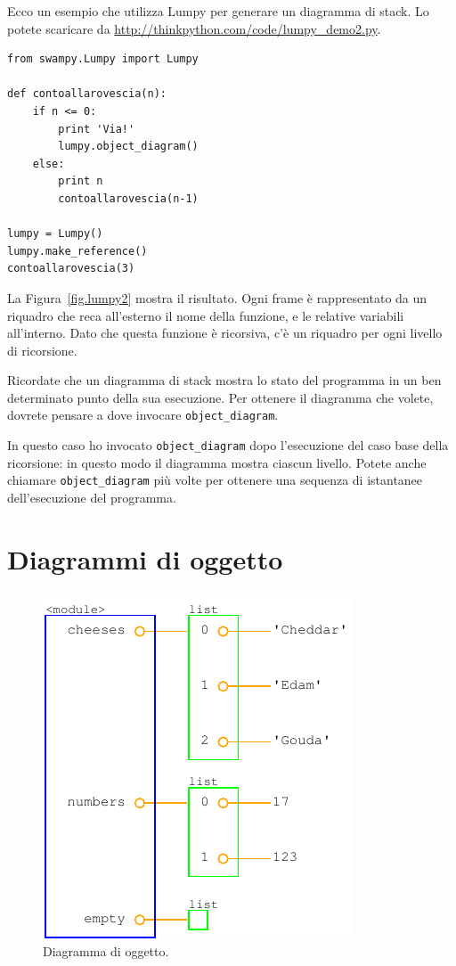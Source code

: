 \documentclass[10pt]{book}
\begin{document}
Ecco un esempio che utilizza Lumpy per generare un diagramma di stack. Lo potete scaricare da \url{http://thinkpython.com/code/lumpy_demo2.py}.

\begin{verbatim}
from swampy.Lumpy import Lumpy

def contoallarovescia(n):
    if n <= 0:
        print 'Via!'
        lumpy.object_diagram()
    else:
        print n
        contoallarovescia(n-1)

lumpy = Lumpy()
lumpy.make_reference()
contoallarovescia(3)
\end{verbatim}

La Figura~\ref{fig.lumpy2} mostra il risultato. Ogni frame è rappresentato da un riquadro che reca all'esterno il nome della funzione, e le relative variabili all'interno. Dato che questa funzione è ricorsiva, c'è un riquadro per ogni livello di ricorsione.

Ricordate che un diagramma di stack mostra lo stato del programma in un ben determinato punto della sua esecuzione. Per ottenere il diagramma che volete, dovrete pensare a dove invocare \verb"object_diagram".

In questo caso ho invocato \verb"object_diagram" dopo l'esecuzione del caso base della ricorsione: in questo modo il diagramma mostra ciascun livello. Potete anche chiamare \verb"object_diagram" più volte per ottenere una sequenza di istantanee dell'esecuzione del programma.


\section{Diagrammi di oggetto}

\begin{figure}
\centerline
{\includegraphics[scale=0.7]{figs/lumpydemo3.pdf}}
\caption{Diagramma di oggetto.}
\label{fig.lumpy3}
\end{figure}
\end{document}
